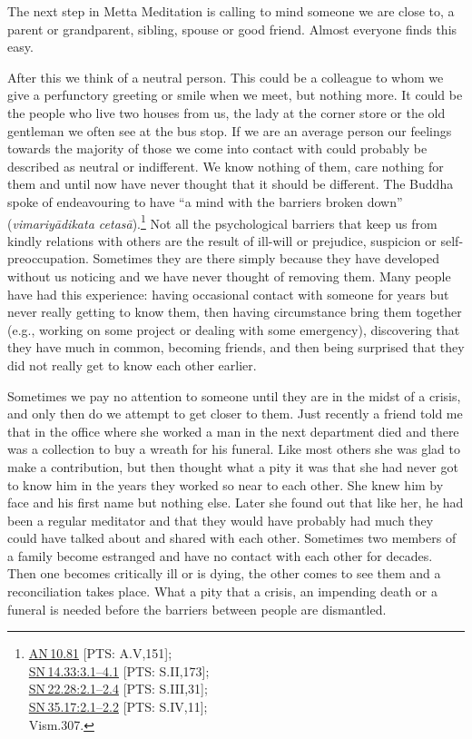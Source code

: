 \documentclass[10pt, openright]{book}
\begin{document}
The next step in Metta Meditation is calling to mind someone we are close to, a parent or grandparent, sibling, spouse or good friend. Almost everyone finds this easy.


After this we think of a neutral person. This could be a colleague to whom we give a perfunctory greeting or smile when we meet, but nothing more. It could be the people who live two houses from us, the lady at the corner store or the old gentleman we often see at the bus stop. If we are an average person our feelings towards the majority of those we come into contact with could probably be described as neutral or indifferent. We know nothing of them, care nothing for them and until now have never thought that it should be different. The Buddha spoke of endeavouring to have “a mind with the barriers broken down” (\textit{vimariyādikata cetasā}).\footnote {\href{https://suttacentral.net/an10.81/en/sujato}{AN 10.81} [PTS: A.V,151];\\
\href{https://suttacentral.net/sn14.33/en/sujato\#3.1}{SN 14.33:3.1–4.1} [PTS: S.II,173];\\
\href{https://suttacentral.net/sn22.28/en/sujato\#2.1}{SN 22.28:2.1–2.4} [PTS: S.III,31];\\
\href{https://suttacentral.net/sn35.17/en/sujato\#2.1}{SN 35.17:2.1–2.2} [PTS: S.IV,11];\\
Vism.307.} Not all the psychological barriers that keep us from kindly relations with others are the result of ill-will or prejudice, suspicion or self-preoccupation. Sometimes they are there simply because they have developed without us noticing and we have never thought of removing them. Many people have had this experience: having occasional contact with someone for years but never really getting to know them, then having circumstance bring them together (e.g., working on some project or dealing with some emergency), discovering that they have much in common, becoming friends, and then being surprised that they did not really get to know each other earlier.


Sometimes we pay no attention to someone until they are in the midst of a crisis, and only then do we attempt to get closer to them. Just recently a friend told me that in the office where she worked a man in the next department died and there was a collection to buy a wreath for his funeral. Like most others she was glad to make a contribution, but then thought what a pity it was that she had never got to know him in the years they worked so near to each other. She knew him by face and his first name but nothing else. Later she found out that like her, he had been a regular meditator and that they would have probably had much they could have talked about and shared with each other. Sometimes two members of a family become estranged and have no contact with each other for decades. Then one becomes critically ill or is dying, the other comes to see them and a reconciliation takes place. What a pity that a crisis, an impending death or a funeral is needed before the barriers between people are dismantled.
\end{document}
